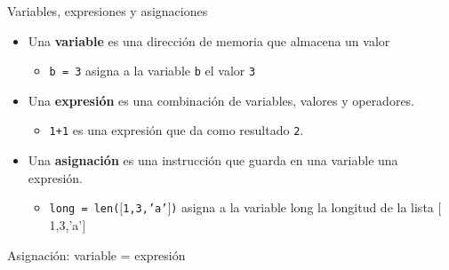 \documentclass{beamer}
\begin{document}
\begin{frame}{Variables, expresiones y asignaciones} \pause
\begin{itemize}
	\item Una \textbf{variable} es una dirección de memoria que almacena un valor\pause
		\begin{itemize}
		\item \texttt{b = 3} asigna a la variable \texttt{b} el valor \texttt{3}\pause
		\end{itemize}
	\item Una \textbf{expresión} es una combinación de variables, valores y operadores.\pause
		\begin{itemize}
		\item \texttt{1+1} es una expresión que da como resultado \texttt{2}.\pause
		\end{itemize}
	\item Una \textbf{asignación} es una instrucción que guarda en una variable una expresión.\pause
		\begin{itemize}
		\item \texttt{long = len($[$1,3,'a'$]$)} asigna a la variable long la longitud de la lista $[$1,3,'a'$]$ \pause
		\end{itemize}
\end{itemize}
\alert{Asignación: variable = expresión}
\end{frame}
\end{document}
